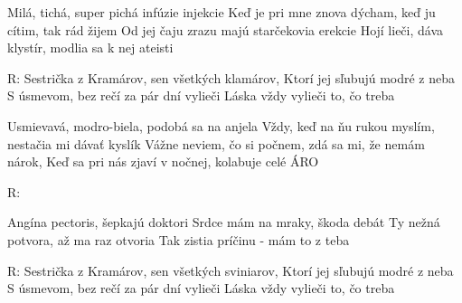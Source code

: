 \resetVars
{}
\MakeHeader
\Lyrics

Milá, tichá, super pichá infúzie injekcie
Keď je pri mne znova dýcham, keď ju cítim, tak rád žijem
Od jej čaju zrazu majú starčekovia erekcie
Hojí lieči, dáva klystír, modlia sa k nej ateisti

R: Sestrička z Kramárov, sen všetkých klamárov,
Ktorí jej sľubujú modré z neba
S úsmevom, bez rečí za pár dní vylieči
Láska vždy vylieči to, čo treba

Usmievavá, modro-biela, podobá sa na anjela
Vždy, keď na ňu rukou myslím, nestačia mi dávať kyslík
Vážne neviem, čo si počnem, zdá sa mi, že nemám nárok,
Keď sa pri nás zjaví v nočnej, kolabuje celé ÁRO

R:

Angína pectoris, šepkajú doktori
Srdce mám na mraky, škoda debát
Ty nežná potvora, až ma raz otvoria
Tak zistia príčinu - mám to z teba

R: Sestrička z Kramárov, sen všetkých sviniarov,
Ktorí jej sľubujú modré z neba
S úsmevom, bez rečí za pár dní vylieči
Láska vždy vylieči to, čo treba

\Next
